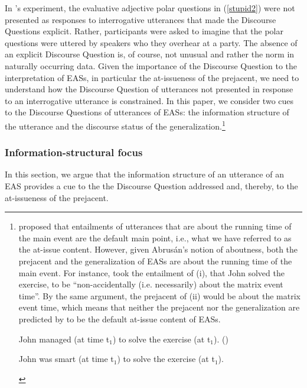 \documentclass[11pt,fleqn]{article}
\newcommand{\6}{\mbox{$[\hspace*{-.6mm}[$}}
\newcommand{\9}{\mbox{$]\hspace*{-.6mm}]$}}
\newcommand{\citepos}[1]{\citeauthor{#1}'s \citeyear{#1}}
\begin{document}
In \citepos{tbd-variability} experiment, the evaluative adjective polar questions in (\ref{stupid2}) were not presented as responses to interrogative utterances that made the Discourse Questions explicit. Rather, participants were asked to imagine that the polar questions were uttered by speakers who they overhear at a party. The absence of an explicit Discourse Question is, of course, not unusual and rather the norm in naturally occurring data. Given the importance of the Discourse Question to the interpretation of EASs, in particular the at-issueness of the prejacent, we need to understand how the Discourse Question of utterances not presented in response to an interrogative utterance is constrained. In this paper, we consider two cues to the Discourse Questions of utterances of EASs: the information structure of the utterance and the discourse status of the generalization.\footnote{\citet{abrusan2011} proposed that entailments of utterances that are about the running time of the main event are the default main point, i.e., what we have referred to as the at-issue content. However, given Abrus\'an's notion of aboutness, both the prejacent and the generalization of EASs are about the running time of the main event. For instance, \citet[508]{abrusan2011} took the entailment of (i), that John solved the exercise, to be ``non-accidentally (i.e. necessarily) about the matrix event time''. By the same argument, the prejacent of (ii) would be about the matrix event time, which means that neither the prejacent nor the generalization are predicted by \citealt{abrusan2011} to be the default at-issue content of EASs.



\begin{exe}
 John managed (at time t$_{\mbox{1}}$) to solve the exercise (at t$_{\mbox{1}}$). \hfill (\citealt[508]{abrusan2011})

 John was smart (at time t$_{\mbox{1}}$) to solve the exercise (at t$_{\mbox{1}}$).

\end{exe}}


\subsubsection{Information-structural focus}\label{s331}

In this section, we argue that the information structure of an utterance of an EAS provides a cue to the the Discourse Question addressed and, thereby, to the at-issueness of the prejacent. 
\end{document}
